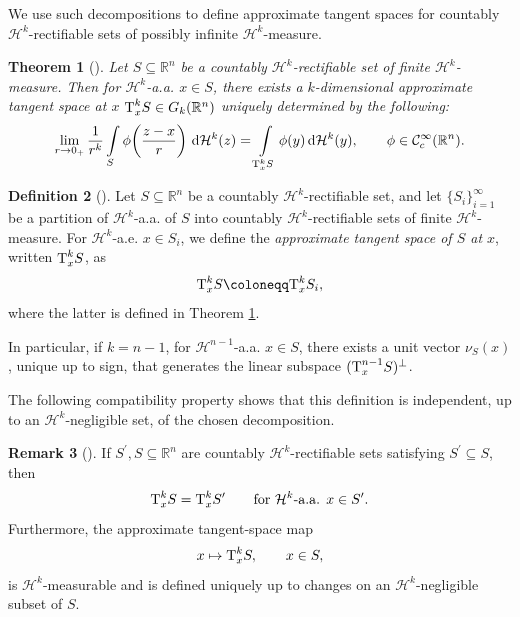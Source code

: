 \documentclass[pdflatex,sn-mathphys-num]{sn-jnl}
\theoremstyle{plain}
\newtheorem{theorem}{Theorem}[section]
\theoremstyle{definition}
\newtheorem{definition}[theorem]{Definition}
\newtheorem{rem}[theorem]{Remark}
\begin{document}
We use such decompositions to define approximate tangent spaces for
countably $\mathcal{H}^k$-rectifiable sets of possibly infinite
$\mathcal{H}^k$-measure.

\begin{theorem}[]\label{klim}
        Let $S\subseteq\mathbb{R}^n$ be a countably $\mathcal{H}^k$-rectifiable set of finite $\mathcal{H}^k$-measure. Then for $\mathcal{H}^k$-a.a. $x\in S$, there exists a $k$-dimensional approximate tangent space at $x$ $\textup{T}^k_xS\in G_k(\mathbb{R}^n)$ uniquely determined by the following: \[
\lim_{r\to0_+}\frac{1}{r^k}\int\limits_S \phi\!\left(\frac{z-x}{r}\right)\,\mathrm{d}\mathcal{H}^k(z)
= \int\limits_{\textup{T}_x^kS} \phi(y)\,\mathrm{d}\mathcal{H}^k(y), \qquad \phi\in\mathcal{C}^{\infty}_c(\mathbb{R}^n).
\]
\end{theorem}

\begin{definition}[]
     Let $S\subseteq\mathbb{R}^n$ be a countably $\mathcal{H}^k$-rectifiable set, and let $\{S_i\}_{i=1}^{\infty}$ be a partition of $\mathcal{H}^k$-a.a. of $S$ into countably $\mathcal{H}^k$-rectifiable sets of finite $\mathcal{H}^k$-measure. For $\mathcal{H}^k$-a.e. $x\in S_i$, we define the \emph{approximate tangent space of $S$ at $x$}, written $\textup{T}_x^kS$, as $$\textup{T}_x^kS\coloneqq \textup{T}_x^kS_i,$$ where the latter is defined in Theorem \ref{klim}.
     
     In particular, if $k=n-1$, for $\mathcal{H}^{n-1}$-a.a. $x\in S$, there exists a unit vector $\nu_S(x)$, unique up to sign, that generates the linear subspace $(\textup{T}^{n-1}_xS)^{\perp}$.
\end{definition}
The following compatibility property shows that this definition is
independent, up to an $\mathcal{H}^k$-negligible set, of the chosen
decomposition.
\begin{rem}[]\label{consistency}
    If $S^{\prime}, S\subseteq\mathbb{R}^n$ are countably $\mathcal{H}^k$-rectifiable sets satisfying $S^{\prime}\subseteq S$, then $$\textup{T}^k_xS=\textup{T}_x^kS^{\prime}\qquad\text{for $\mathcal{H}^k$-a.a. $x\in S^{\prime}.$}$$ Furthermore, the approximate tangent-space map
\[
x\mapsto \textup{T}_x^kS, \qquad x\in S,
\]
is \(\mathcal H^k\)-measurable and is defined uniquely up to changes on an \(\mathcal H^k\)-negligible subset of \(S\).
\end{rem}
\end{document}
